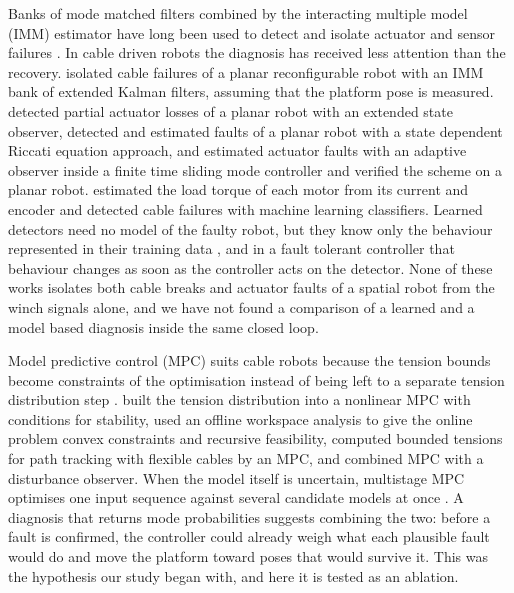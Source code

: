 \documentclass{interact}
\begin{document}
Banks of mode matched filters combined by the interacting multiple model (IMM) estimator \citep{blom1988imm} have long been used to detect and isolate actuator and sensor failures \citep{zhang1998imm}. In cable driven robots the diagnosis has received less attention than the recovery. \citet{raman2023cable} isolated cable failures of a planar reconfigurable robot with an IMM bank of extended Kalman filters, assuming that the platform pose is measured. \citet{majdi2023smc} detected partial actuator losses of a planar robot with an extended state observer, \citet{marufkhani2023sdre} detected and estimated faults of a planar robot with a state dependent Riccati equation approach, and \citet{fazeli2023active} estimated actuator faults with an adaptive observer inside a finite time sliding mode controller and verified the scheme on a planar robot. \citet{bettega2025load} estimated the load torque of each motor from its current and encoder and detected cable failures with machine learning classifiers. Learned detectors need no model of the faulty robot, but they know only the behaviour represented in their training data \citep{khalastchi2019survey}, and in a fault tolerant controller that behaviour changes as soon as the controller acts on the detector. None of these works isolates both cable breaks and actuator faults of a spatial robot from the winch signals alone, and we have not found a comparison of a learned and a model based diagnosis inside the same closed loop.

Model predictive control (MPC) suits cable robots because the tension bounds become constraints of the optimisation instead of being left to a separate tension distribution step \citep{gouttefarde2015tda}. \citet{santos2022nmpc} built the tension distribution into a nonlinear MPC with conditions for stability, \citet{song2022wmpc} used an offline workspace analysis to give the online problem convex constraints and recursive feasibility, \citet{bettega2023mpc} computed bounded tensions for path tracking with flexible cables by an MPC, and \citet{gao2025dobmpc} combined MPC with a disturbance observer. When the model itself is uncertain, multistage MPC optimises one input sequence against several candidate models at once \citep{lucia2013multistage}. A diagnosis that returns mode probabilities suggests combining the two: before a fault is confirmed, the controller could already weigh what each plausible fault would do and move the platform toward poses that would survive it. This was the hypothesis our study began with, and here it is tested as an ablation.
\end{document}
